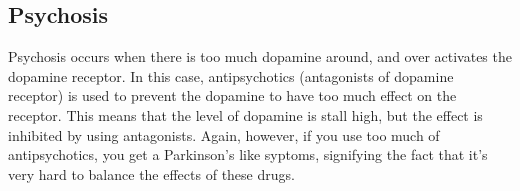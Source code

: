 \subsection{Psychosis}

Psychosis occurs when there is too much dopamine around, and over activates the dopamine receptor.
In this case, antipsychotics (antagonists of dopamine receptor) is used to prevent the dopamine to have too much effect on the receptor.
This means that the level of dopamine is stall high, but the effect is inhibited by using antagonists.
Again, however, if you use too much of antipsychotics, you get a Parkinson's like syptoms, signifying the fact that it's very hard to balance the effects of these drugs.
































